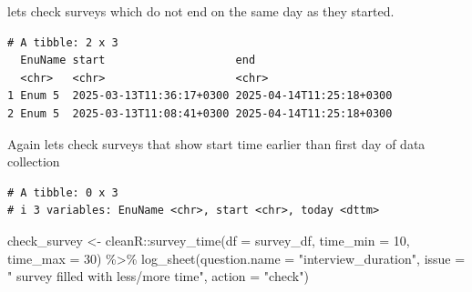 \documentclass[
  letterpaper,
  DIV=11,
  numbers=noendperiod]{scrreprt}
\newenvironment{Shaded}{\begin{snugshade}}{\end{snugshade}}
\newcommand{\AttributeTok}[1]{\textcolor[rgb]{0.40,0.45,0.13}{#1}}
\newcommand{\DecValTok}[1]{\textcolor[rgb]{0.68,0.00,0.00}{#1}}
\newcommand{\FunctionTok}[1]{\textcolor[rgb]{0.28,0.35,0.67}{#1}}
\newcommand{\NormalTok}[1]{\textcolor[rgb]{0.00,0.23,0.31}{#1}}
\newcommand{\OtherTok}[1]{\textcolor[rgb]{0.00,0.23,0.31}{#1}}
\newcommand{\SpecialCharTok}[1]{\textcolor[rgb]{0.37,0.37,0.37}{#1}}
\newcommand{\StringTok}[1]{\textcolor[rgb]{0.13,0.47,0.30}{#1}}
\begin{document}
lets check surveys which do not end on the same day as they started.

\begin{Shaded}
\end{Shaded}

\begin{verbatim}
# A tibble: 2 x 3
  EnuName start                    end                     
  <chr>   <chr>                    <chr>                   
1 Enum 5  2025-03-13T11:36:17+0300 2025-04-14T11:25:18+0300
2 Enum 5  2025-03-13T11:08:41+0300 2025-04-14T11:25:18+0300
\end{verbatim}

Again lets check surveys that show start time earlier than first day of
data collection

\begin{Shaded}
\end{Shaded}

\begin{verbatim}
# A tibble: 0 x 3
# i 3 variables: EnuName <chr>, start <chr>, today <dttm>
\end{verbatim}

\begin{Shaded}
\begin{Highlighting}[]
\NormalTok{check\_survey }\OtherTok{\textless{}{-}}\NormalTok{ cleanR}\SpecialCharTok{::}\FunctionTok{survey\_time}\NormalTok{(}\AttributeTok{df =}\NormalTok{ survey\_df, }\AttributeTok{time\_min =} \DecValTok{10}\NormalTok{, }\AttributeTok{time\_max =} \DecValTok{30}\NormalTok{) }\SpecialCharTok{\%\textgreater{}\%} 
  \FunctionTok{log\_sheet}\NormalTok{(}\AttributeTok{question.name =} \StringTok{"interview\_duration"}\NormalTok{,}
            \AttributeTok{issue =} \StringTok{" survey filled with less/more time"}\NormalTok{,}
            \AttributeTok{action =} \StringTok{"check"}\NormalTok{)}
\end{Highlighting}
\end{Shaded}
\end{document}
